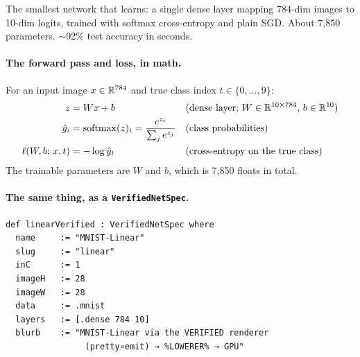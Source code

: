 The smallest network that learns: a single dense layer mapping
784-dim images to 10-dim logits, trained with softmax cross-entropy
and plain SGD. About 7,850 parameters. \(\sim\)92\% test accuracy
in seconds.

\begin{center}
\end{center}

\paragraph{The forward pass and loss, in math.}
For an input image \(x \in \mathbb{R}^{784}\) and true class index
\(t \in \{0, \dots, 9\}\):
\begin{align*}
  z &= W x + b
    &&\text{(dense layer; \(W \in \mathbb{R}^{10 \times 784}\), \(b \in \mathbb{R}^{10}\))} \\
  \hat{y}_i &= \mathrm{softmax}(z)_i = \frac{e^{z_i}}{\sum_j e^{z_j}}
    &&\text{(class probabilities)} \\
  \ell(W, b;\, x, t) &= -\log \hat{y}_t
    &&\text{(cross-entropy on the true class)}
\end{align*}
The trainable parameters are \(W\) and \(b\), which is 7,850 floats
in total.

\paragraph{The same thing, as a \texttt{VerifiedNetSpec}.}
\begin{verbatim}
def linearVerified : VerifiedNetSpec where
  name     := "MNIST-Linear"
  slug     := "linear"
  inC      := 1
  imageH   := 28
  imageW   := 28
  data     := .mnist
  layers   := [.dense 784 10]
  blurb    := "MNIST-Linear via the VERIFIED renderer
                (pretty∘emit) → %LOWERER% → GPU"
\end{verbatim}

